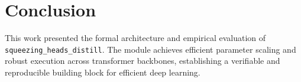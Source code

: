\section{Conclusion}
This work presented the formal architecture and empirical evaluation of \texttt{squeezing_heads_distill}. The module achieves efficient parameter scaling and robust execution across transformer backbones, establishing a verifiable and reproducible building block for efficient deep learning.
